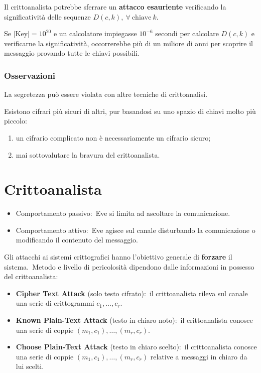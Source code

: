 Il crittoanalista potrebbe sferrare un \textbf{attacco esauriente} verificando la significatività delle sequenze $D(c,k),\ \forall\ \mathrm{chiave}\ k$.

Se $|\mathrm{Key}| = 10^{20}$ e un calcolatore impiegasse $10^{-6}$ secondi per calcolare $D(c,k)$ e verificarne la significatività, occorrerebbe più di un miliore di anni per scoprire il messaggio provando tutte le chiavi possibili.\

\subsubsection{Osservazioni}

La segretezza può essere violata con altre tecniche di crittoanalisi.\

Esistono cifrari più sicuri di altri, pur basandosi su uno spazio di chiavi molto più piccolo:
\begin{enumerate}
    \item un cifrario complicato non è necessariamente un cifrario sicuro;
    \item mai sottovalutare la bravura del crittoanalista.
\end{enumerate}

\section{Crittoanalista}

\begin{itemize}
    \item Comportamento passivo:\ Eve si limita ad ascoltare la comunicazione.
    \item Comportamento attivo:\ Eve agisce sul canale disturbando la comunicazione o modificando il contenuto del messaggio.
\end{itemize}

\noindent Gli attacchi ai sistemi crittografici hanno l'obiettivo generale di \textbf{forzare} il sistema.\
Metodo e livello di pericolosità dipendono dalle informazioni in possesso del crittoanalista:
\begin{itemize}
    \item \textbf{Cipher Text Attack} (solo testo cifrato):\ il crittoanalista rileva sul canale una serie di crittogrammi $c_1,\dots, c_r$.
    \item \textbf{Known Plain-Text Attack} (testo in chiaro noto):\ il crittoanalista conosce una serie di coppie $(m_1,c_1),\dots, (m_r,c_r)$.
    \item \textbf{Choose Plain-Text Attack} (testo in chiaro scelto):\ il crittoanalista conosce una serie di coppie $(m_1,c_1),\dots, (m_r,c_r)$ relative a messaggi in chiaro da lui scelti.
\end{itemize}

